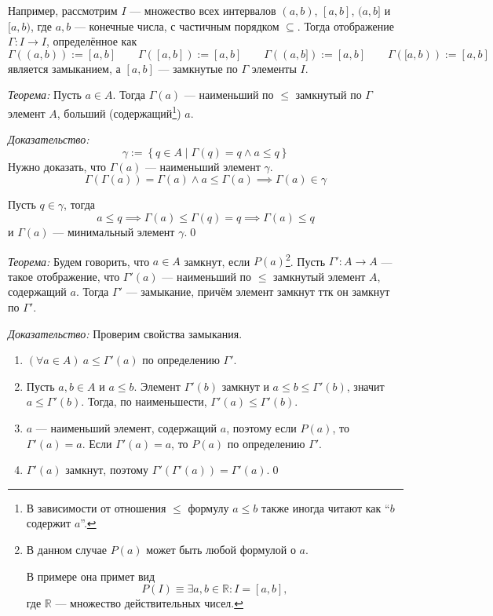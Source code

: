 Например, рассмотрим $I$ --- множество всех интервалов $(a,b)$, $[a,b]$, $(a,b]$
и $[a,b)$, где $a,b$ --- конечные числа, с частичным порядком $\subseteq$.
Тогда отображение $\Gamma:I\to I$, определённое как
\[
  \Gamma((a,b)):=[a,b]\qquad \Gamma([a,b]):=[a,b]\qquad
  \Gamma((a,b]):=[a,b]\qquad \Gamma([a,b)):=[a,b]
\]
является замыканием, а $[a,b]$ --- замкнутые по $\Gamma$ элементы $I$.

\vspace{1em}
{\it Теорема:} Пусть $a\in A$. Тогда $\Gamma(a)$ --- наименьший по $\leq$
замкнутый по $\Gamma$ элемент $A$,
больший (содержащий\footnote{В зависимости от отношения $\leq$ формулу
  $a\leq b$ также иногда читают как ``$b$ содержит $a$''.}) $a$.

  {\it Доказательство:}
\[
  \gamma:=\left\{q\in A\;\big|\; \Gamma(q)=q\land a\leq q\right\}
\]
Нужно доказать, что $\Gamma(a)$ --- наименьший элемент $\gamma$.
\[
  \Gamma(\Gamma(a))=\Gamma(a)\land a\leq\Gamma(a)\implies\Gamma(a)\in\gamma
\]

Пусть $q\in \gamma$, тогда
\[
  a\leq q\implies \Gamma(a)\leq\Gamma(q)=q\implies\Gamma(a)\leq q
\]
и $\Gamma(a)$ --- минимальный элемент $\gamma$.\qed

\newcommand\R{\mathbb R}
\vspace{1em}
{\it Теорема:}
Будем говорить, что ${a\in A}$ замкнут, если $P(a)$\footnote{В данном случае
$P(a)$ может быть любой формулой о $a$.

В примере она примет вид
\[
  P(I)\equiv \exists a,b\in\R:I=[a,b],
\]
где $\R$ --- множество действительных чисел.}.
Пусть ${\Gamma':A\to A}$ --- такое отображение, что $\Gamma'(a)$ --- наименьший по
$\leq$ замкнутый элемент $A$, содержащий $a$. Тогда $\Gamma'$ --- замыкание,
причём элемент замкнут ттк он замкнут по $\Gamma'$.

  {\it Доказательство:}
Проверим свойства замыкания.
\begin{enumerate}
  \item{}$(\forall a\in A)~a\leq \Gamma'(a)$ по определению $\Gamma'$.

  \item{}Пусть $a,b\in A$ и $a\leq b$. Элемент $\Gamma'(b)$ замкнут и
  $a\leq b\leq\Gamma'(b)$, значит $a\leq\Gamma'(b)$. Тогда, по наименьшести,
  $\Gamma'(a)\leq\Gamma'(b)$.

  \item{}$a$ --- наименьший элемент, содержащий $a$, поэтому
  если $P(a)$, то $\Gamma'(a)=a$. Если $\Gamma'(a)=a$, то $P(a)$
  по определению $\Gamma'$.

  \item{}$\Gamma'(a)$ замкнут, поэтому $\Gamma'(\Gamma'(a))=\Gamma'(a)$.\qed
\end{enumerate}

